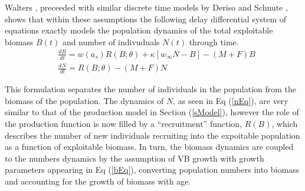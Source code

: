 %
Walters \cite{walters_continuous_2020}, preceeded with similar discrete time models 
by Deriso \cite{deriso_harvesting_1980} and Schnute \cite{schnute_general_1985}, 
shows that within these assumptions the following delay differential system of 
equations exactly models the population dynamics of the total exploitable biomass 
$B(t)$ and number of indivuduals $N(t)$ through time.
%
\begin{align}%
&\frac{dB}{dt} = w(a_s)R(B;\theta) + \kappa \left[w_\infty N-B\right] - (M+F)B \label{bEq}\\
&\frac{dN}{dt} = R(B;\theta) - (M+F)N \label{nEq}
\end{align}

%
This formulation separates the number of individuals in the population from the
biomass of the population. The dynamics of $N$, as seen in Eq (\ref{nEq}), are
very similar to that of the production model in Section (\ref{sModel}), 
however the role of the production function is now filled by a ``recruitment''
function, $R(B)$, which describes the number of new individuals recruiting into the
expoitable population as a function of exploitable biomass. In turn, the biomass
dynamics are coupled to the numbers dynamics by the assumption of VB growth with
growth parameters appearing in Eq (\ref{bEq}), converting population numbers
into biomass and accounting for the growth of biomass with age.

